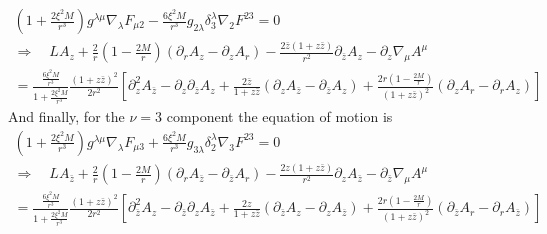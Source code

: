 \documentclass[12pt]{article}
\def\nn{\nonumber}
\begin{document}
\begin{gather}
(1 + \frac{2 \xi^{2} M}{r^{3}} )
g^{\lambda \mu}
\nabla_{\lambda}F_{\mu 2}
-
\frac{6 \xi^{2} M}{r^{3}} 
g_{2 \lambda}
\delta_{3}^{\lambda}
\nabla_{2}F^{2 3}
=0
\nn \\
\Rightarrow
\quad
L A_{z} 
+
\frac{2}{r}
(1 - \frac{2 M}{r})
(\partial_{r} A_{z} - \partial_{z} A_{r})
-
\frac{2 \bar{z} (1 + z \bar{z})}{r^{2}}
\partial_{\bar{z}}
A_{z}
-
\partial_{z}
\nabla_{\mu}
A^{\mu}
\nn \\
=
\frac{\frac{6 \xi^{2} M}{r^{3}} }{1 + \frac{2 \xi^{2} M}{r^{3}}}
\frac{(1 + z \bar{z})^{2}}{2 r^{2}}
\left[
\partial_{z}^{2}A_{\bar{z}}
-
\partial_{z} \partial_{\bar{z}} A_{z}
+
\frac{2 \bar{z}}{1 + z \bar{z}}
(\partial_{z} A_{\bar{z}}
-
\partial_{\bar{z}} A_{z})
+
\frac{2 r (1 - \frac{2 M}{r})}{(1 + z \bar{z})^{2}}
(\partial_{z} A_{r}
-
\partial_{r} A_{z})
\right]
\end{gather}
And finally, for the $\nu=3$ component the equation of motion is
\begin{gather}
(1 + \frac{2 \xi^{2} M}{r^{3}} )
g^{\lambda \mu}
\nabla_{\lambda}F_{\mu 3}
+
\frac{6 \xi^{2} M}{r^{3}} 
g_{3 \lambda}
\delta_{2}^{\lambda}
\nabla_{3}F^{2 3}
=0
\nn \\
\Rightarrow
\quad
L A_{\bar{z}} 
+
\frac{2}{r}
(1 - \frac{2 M}{r})
(\partial_{r} A_{\bar{z}} - \partial_{\bar{z}} A_{r})
-
\frac{2 z (1 + z \bar{z})}{r^{2}}
\partial_{z}
A_{\bar{z}}
-
\partial_{\bar{z}}
\nabla_{\mu}
A^{\mu}
\nn \\
=
\frac{\frac{6 \xi^{2} M}{r^{3}} }{1 + \frac{2 \xi^{2} M}{r^{3}}}
\frac{(1 + z \bar{z})^{2}}{2 r^{2}}
\left[
\partial_{\bar{z}}^{2}A_{z}
-
\partial_{\bar{z}} \partial_{z} A_{\bar{z}}
+
\frac{2 z}{1 + z \bar{z}}
(\partial_{\bar{z}} A_{z}
-
\partial_{z} A_{\bar{z}})
+
\frac{2 r (1 - \frac{2 M}{r})}{(1 + z \bar{z})^{2}}
(\partial_{\bar{z}} A_{r}
-
\partial_{r} A_{\bar{z}})
\right]
\end{gather}


\end{document}

